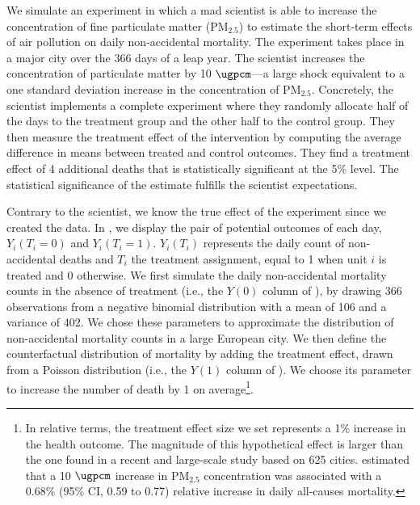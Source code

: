 \documentclass[12pt]{article}
\renewcommand{\thefootnote}{\fnsymbol{footnote}}
\begin{document}
    \renewcommand*{\thefootnote}{\arabic{footnote}}
    \setcounter{footnote}{0}

    We simulate an experiment in which a mad scientist is able to increase the concentration of fine particulate matter (PM$_{2.5}$) to estimate the short-term effects of air pollution on daily non-accidental mortality. The experiment takes place in a major city over the 366 days of a leap year. The scientist increases the concentration of particulate matter by 10 $\si{\ugpcm}$---a large shock equivalent to a one standard deviation increase in the concentration of PM$_{2.5}$. Concretely, the scientist implements a complete experiment where they randomly allocate half of the days to the treatment group and the other half to the control group. They then measure the treatment effect of the intervention by computing the average difference in means between treated and control outcomes. They find a treatment effect of 4 additional deaths that is statistically significant at the 5\% level. The statistical significance of the estimate fulfills the scientist expectations.
    
            

    Contrary to the scientist, we know the true effect of the experiment since we created the data. In , we display the pair of potential outcomes of each day, $Y_{i}(T_{i}=0)$ and $Y_{i}(T_{i}=1)$. $Y_{i}(T_{i})$ represents the daily count of non-accidental deaths and $T_{i}$ the treatment assignment, equal to 1 when unit $i$ is treated and 0 otherwise. We first simulate the daily non-accidental mortality counts in the absence of treatment (i.e., the $Y(0)$ column of ), by drawing 366 observations from a negative binomial distribution with a mean of 106 and a variance of 402. We chose these parameters to approximate the distribution of non-accidental mortality counts in a large European city. We then define the counterfactual distribution of mortality by adding the treatment effect, drawn from a Poisson distribution (i.e., the $Y(1)$ column of ). We choose its parameter to increase the number of death by 1 on average\footnote{In relative terms, the treatment effect size we set represents a 1\% increase in the health outcome. The magnitude of this hypothetical effect is larger than the one found in a recent and large-scale study based on 625 cities. \cite{liu_ambient_2019} estimated that a 10 $\si{\ugpcm}$ increase in $\text{PM}_{2.5}$ concentration was associated with a 0.68\% (95\% CI, 0.59 to 0.77) relative increase in daily all-causes mortality.}.
\end{document}
